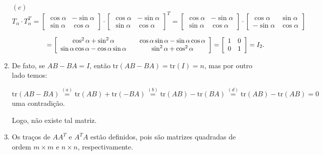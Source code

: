 \documentclass{report}
\begin{document}
\begin{enumerate}
$(c)$ $T_\alpha \cdot T_\alpha^T=\left[
\begin{array}{rr}
\cos \alpha & -\sin \alpha \\
\sin \alpha & \cos \alpha
\end{array}
\right] \cdot \left[
\begin{array}{rr}
\cos \alpha & -\sin \alpha \\
\sin \alpha & \cos \alpha
\end{array}
\right]^T= \left[
\begin{array}{rr}
\cos \alpha & -\sin \alpha \\
\sin \alpha & \cos \alpha
\end{array}
\right] \cdot \left[
\begin{array}{rr}
\cos \alpha & \sin \alpha \\
-\sin \alpha & \cos \alpha
\end{array}
\right]$

$\hspace{1.8cm}=\left[
\begin{array}{ccc}
\cos^2 \alpha  + \sin^2 \alpha & & \cos \alpha \sin \alpha -\sin \alpha \cos \alpha \\
\sin \alpha \cos \alpha - \cos \alpha \sin \alpha & & \sin^2
\alpha + \cos^2 \alpha
\end{array}
\right]= \left[
\begin{array}{rr}
1 & 0 \\
0 & 1
\end{array}
\right]=I_2.$



\item De fato, se $AB-BA=I$, então $\textrm{tr}(AB-BA) =
\textrm{tr}(I)=n$, mas por outro lado temos:

$\textrm{tr}(AB-BA) \stackrel{(a)}{=} \textrm{tr}(AB) +
\textrm{tr}(-BA)\stackrel{(b)}{=} \textrm{tr}(AB) -
\textrm{tr}(BA)\stackrel{(d)}{=} \textrm{tr}(AB) -
\textrm{tr}(AB)=0$ uma contradição.

Logo, não existe tal matriz.




\item Os traços de $AA^{T}$ e $A^{T}A$ estão definidos, pois são
matrizes quadradas de ordem $m \times m$ e $n \times n$,
respectivamente.


\end{enumerate}
\end{document}
